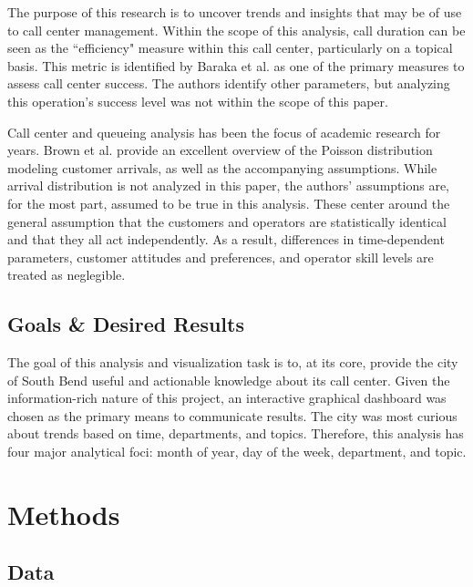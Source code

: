 \documentclass{article}
\begin{document}
The purpose of this research is to uncover trends and insights that may be of use to call center management.  Within the scope of this analysis, call duration can be seen as the ``efficiency" measure within this call center, particularly on a topical basis.  This metric is identified by Baraka et al. as one of the primary measures to assess call center success.\cite{baraka}  The authors identify other parameters, but analyzing this operation's success level was not within the scope of this paper.
\par
Call center and queueing analysis has been the focus of academic research for years.  Brown et al. provide an excellent overview of the Poisson distribution modeling customer arrivals, as well as the accompanying assumptions.  While arrival distribution is not analyzed in this paper, the authors' assumptions are, for the most part, assumed to be true in this analysis.  These center around the general assumption that the customers and operators are statistically identical and that they all act independently.\cite{brown}  As a result, differences in time-dependent parameters, customer attitudes and preferences, and operator skill levels are treated as neglegible.



	\subsection{Goals \& Desired Results}

The goal of this analysis and visualization task is to, at its core, provide the city of South Bend useful and actionable knowledge about its call center.  Given the information-rich nature of this project, an interactive graphical dashboard was chosen as the primary means to communicate results.  The city was most curious about trends based on time, departments, and topics.  Therefore, this analysis has four major analytical foci:  month of year, day of the week, department, and topic.


\section{Methods}

	\subsection{Data}
\end{document}
